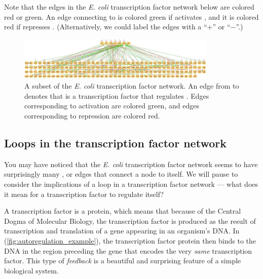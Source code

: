 Note that the edges in the \textit{E. coli} transcription factor network below are colored red or green. An edge connecting  to  is colored green if  activates , and it is colored red if  represses . (Alternatively, we could label the edges with a ``+'' or ``$-$''.)\\

\begin{figure}[h]
\centering
\mySfFamily
\includegraphics[width = 0.85\textwidth]{../images/e_coli_tf_network.jpeg}
\caption{A subset of the \textit{E. coli} transcription factor network. An edge from  to  denotes that  is a transcription factor that regulates . Edges corresponding to activation are colored green, and edges corresponding to repression are colored red.}
\label{fig:e_coli_tf_network}
\end{figure}

\begin{qbox}\end{qbox}

\FloatBarrier
{}
\subsection{Loops in the transcription factor network}

You may have noticed that the \textit{E. coli} transcription factor network seems to have surprisingly many , or edges that connect a node to itself. We will pause to consider the implications of a loop in a transcription factor network --- what does it mean for a transcription factor to regulate itself?

A transcription factor is a protein, which means that because of the Central Dogma of Molecular Biology, the transcription factor is produced as the result of transcription and translation of a gene appearing in an organism's DNA. In  (\autoref{fig:autoregulation_example}), the transcription factor protein then binds to the DNA in the region preceding the gene that encodes the very \textit{same} transcription factor. This type of \textit{feedback} is a beautiful and surprising feature of a simple biological system.

